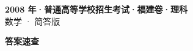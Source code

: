 \documentclass[zihao=-4, a4paper]{ctexart}
\begin{document}
\begin{center}
  {\Large\bfseries 2008 年·普通高等学校招生考试·福建卷·理科}\\[4pt]
  {\large 数学 · 简答版}
\end{center}
\medskip
{}

\clearpage
{}
\begin{center}{\Large\bfseries 答案速查}\end{center}
\medskip

\end{document}
